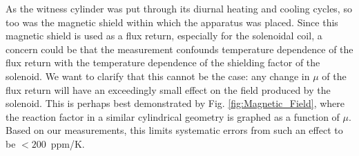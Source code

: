 








As the witness cylinder was put through its diurnal heating and
cooling cycles, so too was the magnetic shield within which the
apparatus was placed.  Since this magnetic shield is used as a flux
return, especially for the solenoidal coil, a concern could be that
the measurement confounds temperature dependence of the flux return
with the temperature dependence of the shielding factor of the
solenoid.  We want to clarify that this cannot be the case: any change
in $\mu$ of the flux return will have an exceedingly small effect on
the field produced by the solenoid.  This is perhaps best demonstrated
by Fig. \ref{fig:Magnetic_Field}, where the reaction factor in a
similar cylindrical geometry is graphed as a function of $\mu$.  Based
on our measurements, this limits systematic errors from such an effect
to be $<200$~ppm/K.


